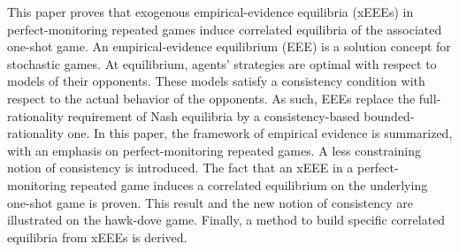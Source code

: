 This paper proves that exogenous empirical-evidence equilibria (xEEEs) in perfect-monitoring repeated games induce correlated equilibria of the associated one-shot game.
An empirical-evidence equilibrium (EEE) is a solution concept for stochastic games.
At equilibrium, agents’ strategies are optimal with respect to models of their opponents.
These models satisfy a consistency condition with respect to the actual behavior of the opponents.
As such, EEEs replace the full-rationality requirement of Nash equilibria by a consistency-based bounded-rationality one.
In this paper, the framework of empirical evidence is summarized, with an emphasis on perfect-monitoring repeated games.
A less constraining notion of consistency is introduced.
The fact that an xEEE in a perfect-monitoring repeated game induces a correlated equilibrium on the underlying one-shot game is proven.
This result and the new notion of consistency are illustrated on the hawk-dove game.
Finally, a method to build specific correlated equilibria from xEEEs is derived.

